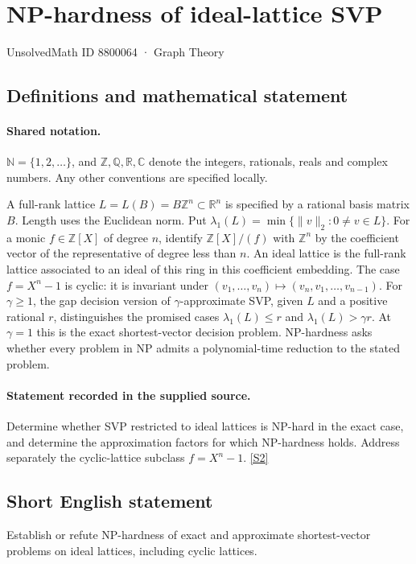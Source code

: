 \documentclass[11pt]{article}
\newcommand{\sref}[2]{\hyperlink{source:#1:#2}{[S#2]}}
\begin{document}
\setcounter{section}{8800063}
\section{NP-hardness of ideal-lattice SVP}\label{8800064}
{\small\sffamily UnsolvedMath ID 8800064 · Graph Theory}
\subsection{Definitions and mathematical statement}

\paragraph{Shared notation.}$\mathbb N=\{1,2,\ldots\}$, and $\mathbb Z,\mathbb Q,\mathbb R,\mathbb C$ denote the integers, rationals, reals and complex numbers. Any other conventions are specified locally.


A full-rank lattice $L=L(B)=B\mathbb Z^n\subset\mathbb R^n$ is specified by a rational basis matrix $B$. Length uses the Euclidean norm. Put $\lambda_1(L)=\min\{\|v\|_2:0\ne v\in L\}$. For a monic $f\in\mathbb Z[X]$ of degree $n$, identify $\mathbb Z[X]/(f)$ with $\mathbb Z^n$ by the coefficient vector of the representative of degree less than $n$. An ideal lattice is the full-rank lattice associated to an ideal of this ring in this coefficient embedding. The case $f=X^n-1$ is cyclic: it is invariant under $(v_1,\ldots,v_n)\mapsto(v_n,v_1,\ldots,v_{n-1})$. For $\gamma\ge1$, the gap decision version of $\gamma$-approximate SVP, given $L$ and a positive rational $r$, distinguishes the promised cases $\lambda_1(L)\le r$ and $\lambda_1(L)>\gamma r$. At $\gamma=1$ this is the exact shortest-vector decision problem. NP-hardness asks whether every problem in NP admits a polynomial-time reduction to the stated problem.
\paragraph{Statement recorded in the supplied source.}
Determine whether SVP restricted to ideal lattices is NP-hard in the exact case, and determine the approximation factors for which NP-hardness holds. Address separately the cyclic-lattice subclass $f=X^n-1$. \sref{8800064}{2}

\subsection{Short English statement}
Establish or refute NP-hardness of exact and approximate shortest-vector problems on ideal lattices, including cyclic lattices.
\end{document}
